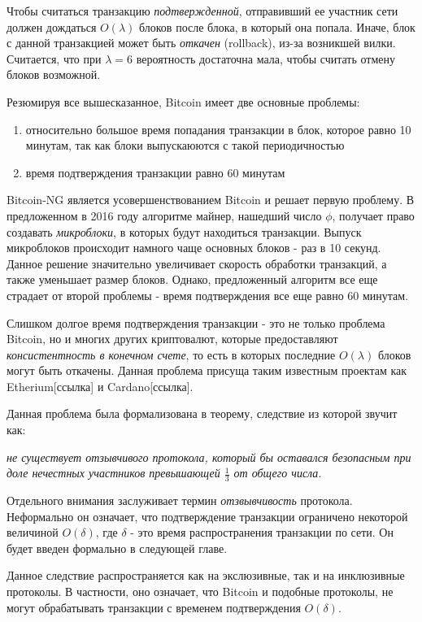 Чтобы считаться транзакцию \textit{подтвержденной}, отправивший ее участник сети должен дождаться $O(\lambda)$  блоков после блока, в который она попала. Иначе, блок с данной транзакцией может быть \textit{откачен} (rollback), из-за возникшей вилки. Считается, что при $\lambda=6$ вероятность достаточна мала, чтобы считать отмену блоков возможной.

Резюмируя все вышесказанное, Bitcoin имеет две основные проблемы:
\begin{enumerate}
\item относительно большое время попадания транзакции в блок, которое равно 10 минутам, так как блоки выпускаюются с такой периодичностью
\item время подтверждения транзакции равно 60 минутам
\end{enumerate} \vspace{10pt}

Bitcoin-NG \cite{bitcoin-ng} является усовершенствованием Bitcoin и решает первую проблему. В предложенном в 2016 году алгоритме майнер, нашедший число $\phi$,  получает право создавать \textit{микроблоки}, в которых будут находиться транзакции. Выпуск микроблоков происходит намного чаще основных блоков - раз в 10 секунд. Данное решение значительно увеличивает скорость обработки транзакций, а также уменьшает размер блоков.
Однако, предложенный алгоритм все еще страдает от второй проблемы - время подтверждения все еще равно 60 минутам.

Слишком долгое время подтверждения транзакции - это не только проблема Bitcoin, но и многих других криптовалют, которые предоставляют \textit{консистентность в конечном счете}, то есть в которых последние $O(\lambda)$ блоков могут быть откачены. Данная проблема присуща таким известным проектам как Etherium[ссылка] и Cardano[ссылка].

Данная проблема была формализована \cite{hybrid-consensus} в теорему, следствие из которой звучит как: 
\par \textit{не существует отзывчивого протокола, который бы оставался безопасным при доле нечестных участников превышающей $\frac{1}{3}$ от общего числа}.

Отдельного внимания заслуживает термин \textit{отзвывчивость} протокола. Неформально он означает, что подтверждение транзакции ограничено некоторой величиной $O(\delta)$, где $\delta$ - это время распространения транзакции по сети. Он будет введен формально в следующей главе.
 
Данное следствие распространяется как на экслюзивные, так и на инклюзивные протоколы. 
В частности, оно означает, что Bitcoin и подобные протоколы, не могут обрабатывать транзакции с временем подтверждения $O(\delta)$.
\finishrelatedwork
